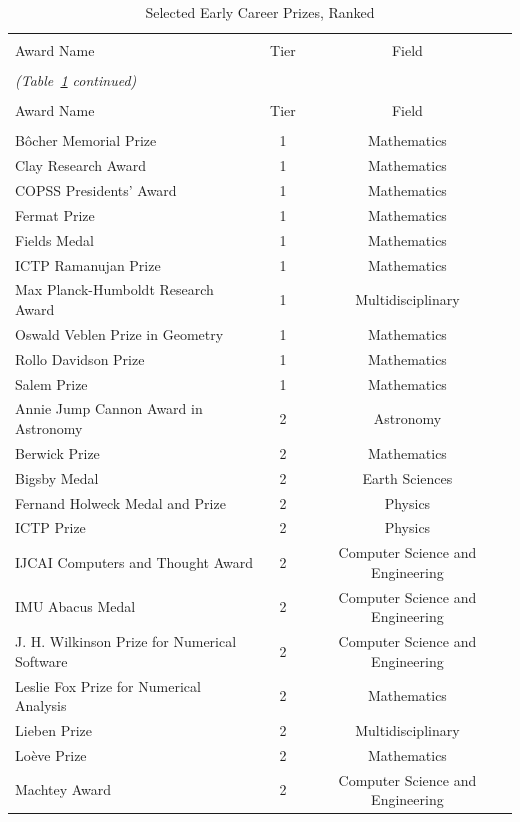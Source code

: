 \begingroup\small \begin{longtable}{lcc} \caption{Selected Early Career Prizes, Ranked} \label{listOfECPrizes} 
\\[-1.8ex]\hline 
\hline \\[-1.8ex] 
Award Name & Tier & Field \\ 
\hline \\[-1.8ex] 
\endfirsthead
\multicolumn{3}{l}{\small\textit{(Table~\ref{listOfECPrizes} continued)}} \\[2pt]
\hline \hline \\[-1.8ex]
Award Name & Tier & Field \\ 
\hline \\[-1.8ex] 
\endhead
Bôcher Memorial Prize & 1 & Mathematics \\ 
Clay Research Award & 1 & Mathematics \\ 
COPSS Presidents' Award & 1 & Mathematics \\ 
Fermat Prize & 1 & Mathematics \\ 
Fields Medal & 1 & Mathematics \\ 
ICTP Ramanujan Prize & 1 & Mathematics \\ 
Max Planck-Humboldt Research Award & 1 & Multidisciplinary \\ 
Oswald Veblen Prize in Geometry & 1 & Mathematics \\ 
Rollo Davidson Prize & 1 & Mathematics \\ 
Salem Prize & 1 & Mathematics \\ 
Annie Jump Cannon Award in Astronomy & 2 & Astronomy \\ 
Berwick Prize & 2 & Mathematics \\ 
Bigsby Medal & 2 & Earth Sciences \\ 
Fernand Holweck Medal and Prize & 2 & Physics \\ 
ICTP Prize & 2 & Physics \\ 
IJCAI Computers and Thought Award & 2 & Computer Science and Engineering \\ 
IMU Abacus Medal & 2 & Computer Science and Engineering \\ 
J. H. Wilkinson Prize for Numerical Software & 2 & Computer Science and Engineering \\ 
Leslie Fox Prize for Numerical Analysis & 2 & Mathematics \\ 
Lieben Prize & 2 & Multidisciplinary \\ 
Loève Prize & 2 & Mathematics \\ 
Machtey Award & 2 & Computer Science and Engineering \\ 

\end{longtable}
